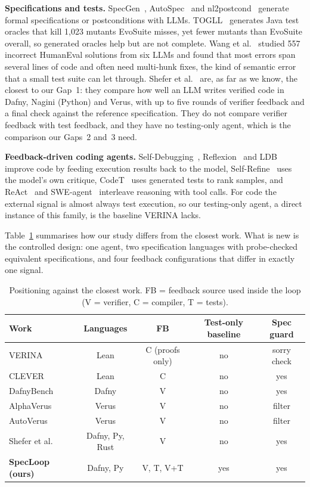 \textbf{Specifications and tests.}
SpecGen~\cite{ma2025specgen}, AutoSpec~\cite{wen2024autospec} and nl2postcond~\cite{endres2024nl2postcond} generate formal specifications or postconditions with LLMs. TOGLL~\cite{hossain2025togll} generates Java test oracles that kill 1,023 mutants EvoSuite misses, yet fewer mutants than EvoSuite overall, so generated oracles help but are not complete. Wang et al.~\cite{wang2025errors} studied 557 incorrect HumanEval solutions from six LLMs and found that most errors span several lines of code and often need multi-hunk fixes, the kind of semantic error that a small test suite can let through. Shefer et al.~\cite{shefer2025mainstream} are, as far as we know, the closest to our Gap~1: they compare how well an LLM writes verified code in Dafny, Nagini (Python) and Verus, with up to five rounds of verifier feedback and a final check against the reference specification. They do not compare verifier feedback with test feedback, and they have no testing-only agent, which is the comparison our Gaps~2 and~3 need.

\textbf{Feedback-driven coding agents.}
Self-Debugging~\cite{chen2024selfdebug}, Reflexion~\cite{shinn2023reflexion} and LDB~\cite{zhong2024ldb} improve code by feeding execution results back to the model, Self-Refine~\cite{madaan2023selfrefine} uses the model's own critique, CodeT~\cite{chen2023codet} uses generated tests to rank samples, and ReAct~\cite{yao2023react} and SWE-agent~\cite{yang2024sweagent} interleave reasoning with tool calls. For code the external signal is almost always test execution, so our testing-only agent, a direct instance of this family, is the baseline VERINA lacks.

Table~\ref{tab:positioning} summarises how our study differs from the closest work. What is new is the controlled design: one agent, two specification languages with probe-checked equivalent specifications, and four feedback configurations that differ in exactly one signal.

\begin{table}[t]
\centering
\caption{Positioning against the closest work. FB = feedback source used inside the loop (V = verifier, C = compiler, T = tests).}
\label{tab:positioning}
\footnotesize
\setlength{\tabcolsep}{3pt}
\begin{tabular}{lcccc}
\toprule
Work & Languages & FB & Test-only baseline & Spec guard \\
\midrule
VERINA~\cite{ye2026verina} & Lean & C (proofs only) & no & sorry check \\
CLEVER~\cite{thakur2025clever} & Lean & C & no & yes \\
DafnyBench~\cite{loughridge2025dafnybench} & Dafny & V & no & yes \\
AlphaVerus~\cite{aggarwal2025alphaverus} & Verus & V & no & filter \\
AutoVerus~\cite{yang2025autoverus} & Verus & V & no & filter \\
Shefer et al.~\cite{shefer2025mainstream} & Dafny, Py, Rust & V & no & yes \\
\textbf{SpecLoop (ours)} & Dafny, Py & V, T, V+T & yes & yes \\
\bottomrule
\end{tabular}
\end{table}
